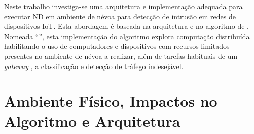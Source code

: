 



Neste trabalho investiga-se uma arquitetura e implementação adequada para
executar \acf{ND} em ambiente de névoa para detecção de intrusão em redes de
dispositivos \acf{IoT}.
Esta abordagem é baseada na arquitetura \arch \cite{Cassales2019} e no algoritmo
de \nd \minas \cite{Faria2016minas}.
Nomeada ``\mfog'', esta implementação do algoritmo \minas explora computação
distribuída habilitando o uso de computadores e dispositivos com recursos
limitados presentes no ambiente de névoa a realizar, além de tarefas habituais
de um \emph{gateway} \iot, a classificação e detecção de tráfego indesejável.

\section{Ambiente Físico, Impactos no Algoritmo e Arquitetura}

